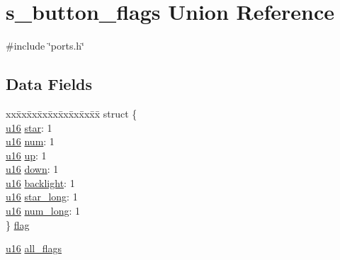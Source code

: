 \hypertarget{unions__button__flags}{\section{s\-\_\-button\-\_\-flags \-Union \-Reference}
\label{unions__button__flags}
}


{\ttfamily \#include \char`\"{}ports.\-h\char`\"{}}

\subsection*{\-Data \-Fields}
\begin{DoxyCompactItemize}
\item 
\begin{tabbing}
xx\=xx\=xx\=xx\=xx\=xx\=xx\=xx\=xx\=\kill
struct \{\\
\>\hyperlink{main__ED__BM_8c_a9e6c91d77e24643b888dbd1a1a590054}{u16} \hyperlink{unions__button__flags_ab06a13036c307fb4aea16a4831bcceb4}{star}: 1\\
\>\hyperlink{main__ED__BM_8c_a9e6c91d77e24643b888dbd1a1a590054}{u16} \hyperlink{unions__button__flags_a79f35fb0af326a4d93260b9d960f4e2d}{num}: 1\\
\>\hyperlink{main__ED__BM_8c_a9e6c91d77e24643b888dbd1a1a590054}{u16} \hyperlink{unions__button__flags_af8b4ed22215bcf4c202e7024db0a7342}{up}: 1\\
\>\hyperlink{main__ED__BM_8c_a9e6c91d77e24643b888dbd1a1a590054}{u16} \hyperlink{unions__button__flags_add3a702c5221470c92acd98f43495e39}{down}: 1\\
\>\hyperlink{main__ED__BM_8c_a9e6c91d77e24643b888dbd1a1a590054}{u16} \hyperlink{unions__button__flags_a9c01e71f3e1f008f660d67bce0059c11}{backlight}: 1\\
\>\hyperlink{main__ED__BM_8c_a9e6c91d77e24643b888dbd1a1a590054}{u16} \hyperlink{unions__button__flags_a41f7e451ac6128e42220e3c7979051e2}{star\_long}: 1\\
\>\hyperlink{main__ED__BM_8c_a9e6c91d77e24643b888dbd1a1a590054}{u16} \hyperlink{unions__button__flags_a0215f6dd0f13413f77b8c6743efb2fc4}{num\_long}: 1\\
\} \hyperlink{unions__button__flags_ad7c65f6c36fa94fd00add6e01ec958c7}{flag}\\

\end{tabbing}\item 
\hyperlink{main__ED__BM_8c_a9e6c91d77e24643b888dbd1a1a590054}{u16} \hyperlink{unions__button__flags_abf876e68df8575f02084e137cc49266b}{all\-\_\-flags}
\end{DoxyCompactItemize}


